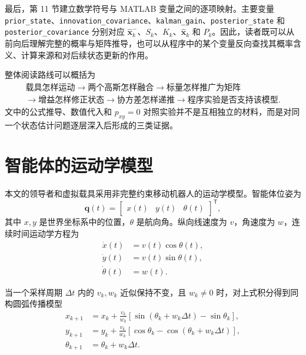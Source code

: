 \documentclass[UTF8,a4paper,11pt]{ctexart}
\newcommand{\prior}{^{-}}
\newcommand{\transpose}{^{\mathsf T}}
\begin{document}
最后，第 11 节建立数学符号与 MATLAB 变量之间的逐项映射。主要变量 \nolinkurl{prior_state}、\nolinkurl{innovation_covariance}、\nolinkurl{kalman_gain}、\nolinkurl{posterior_state} 和 \nolinkurl{posterior_covariance} 分别对应 $\hat{\bm x}_k\prior$、$S_k$、$K_k$、$\hat{\bm x}_k$ 和 $P_k$。因此，读者既可以从前向后理解完整的概率与矩阵推导，也可以从程序中的某个变量反向查找其概率含义、计算来源和对后续状态更新的作用。

整体阅读路线可以概括为
\begin{equation}
\boxed{
\begin{gathered}
\text{载具怎样运动}
\longrightarrow
\text{两个高斯怎样融合}
\longrightarrow
\text{标量怎样推广为矩阵}\\
\longrightarrow
\text{增益怎样修正状态}
\longrightarrow
\text{协方差怎样递推}
\longrightarrow
\text{程序实验是否支持该模型}.
\end{gathered}
}
\end{equation}
文中的公式推导、数值代入和 $p_{xy}=0$ 对照实验并不是互相独立的材料，而是对同一个状态估计问题逐层深入后形成的三类证据。

\newpage

\section{智能体的运动学模型}

本文的领导者和虚拟载具采用非完整约束移动机器人的运动学模型。智能体位姿为
\begin{equation}
\bm q(t)=
\begin{bmatrix}
x(t)&y(t)&\theta(t)
\end{bmatrix}\transpose,
\end{equation}
其中 $x,y$ 是世界坐标系中的位置，$\theta$ 是航向角。纵向线速度为 $v$，角速度为 $w$，连续时间运动学方程为
\begin{align}
\dot x(t)&=v(t)\cos\theta(t),\\
\dot y(t)&=v(t)\sin\theta(t),\\
\dot\theta(t)&=w(t).
\end{align}

当一个采样周期 $\Delta t$ 内的 $v_k,w_k$ 近似保持不变，且 $w_k\neq0$ 时，对上式积分得到同构圆弧传播模型
\begin{align}
x_{k+1}
&=x_k+
\frac{v_k}{w_k}
\left[
\sin(\theta_k+w_k\Delta t)-\sin\theta_k
\right],\\
y_{k+1}
&=y_k+
\frac{v_k}{w_k}
\left[
\cos\theta_k-\cos(\theta_k+w_k\Delta t)
\right],\\
\theta_{k+1}&=\theta_k+w_k\Delta t.
\end{align}
\end{document}
